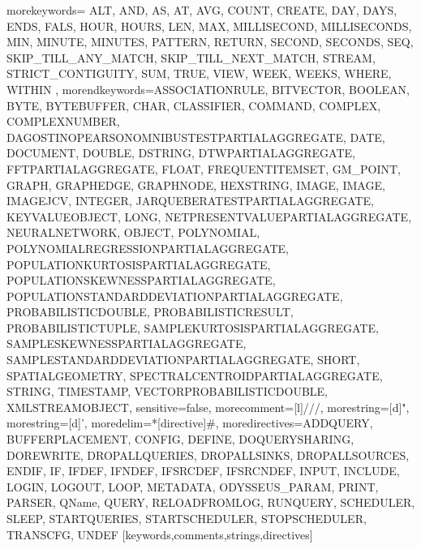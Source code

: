    {morekeywords={%
ALT, AND, AS, AT, AVG, COUNT, CREATE, DAY, DAYS, ENDS, FALS, HOUR, HOURS, LEN, MAX, MILLISECOND, MILLISECONDS, MIN, MINUTE, MINUTES, PATTERN, RETURN, SECOND, SECONDS, SEQ, SKIP_TILL_ANY_MATCH, SKIP_TILL_NEXT_MATCH, STREAM, STRICT_CONTIGUITY, SUM, TRUE, VIEW, WEEK, WEEKS, WHERE, WITHIN%
      },%
   morendkeywords={ASSOCIATIONRULE, BITVECTOR, BOOLEAN, BYTE, BYTEBUFFER, CHAR, CLASSIFIER, COMMAND, COMPLEX, COMPLEXNUMBER, DAGOSTINOPEARSONOMNIBUSTESTPARTIALAGGREGATE, DATE, DOCUMENT, DOUBLE, DSTRING, DTWPARTIALAGGREGATE, FFTPARTIALAGGREGATE, FLOAT, FREQUENTITEMSET, GM_POINT, GRAPH, GRAPHEDGE, GRAPHNODE, HEXSTRING, IMAGE, IMAGE, IMAGEJCV, INTEGER, JARQUEBERATESTPARTIALAGGREGATE, KEYVALUEOBJECT, LONG, NETPRESENTVALUEPARTIALAGGREGATE, NEURALNETWORK, OBJECT, POLYNOMIAL, POLYNOMIALREGRESSIONPARTIALAGGREGATE, POPULATIONKURTOSISPARTIALAGGREGATE, POPULATIONSKEWNESSPARTIALAGGREGATE, POPULATIONSTANDARDDEVIATIONPARTIALAGGREGATE, PROBABILISTICDOUBLE, PROBABILISTICRESULT, PROBABILISTICTUPLE, SAMPLEKURTOSISPARTIALAGGREGATE, SAMPLESKEWNESSPARTIALAGGREGATE, SAMPLESTANDARDDEVIATIONPARTIALAGGREGATE, SHORT, SPATIALGEOMETRY, SPECTRALCENTROIDPARTIALAGGREGATE, STRING, TIMESTAMP, VECTORPROBABILISTICDOUBLE, XMLSTREAMOBJECT},%
   sensitive=false,
   morecomment=[l]///,%
   morestring=[d]",%
   morestring=[d]',%
   moredelim=*[directive]\#,%
   moredirectives={ADDQUERY, BUFFERPLACEMENT, CONFIG, DEFINE, DOQUERYSHARING, DOREWRITE, DROPALLQUERIES, DROPALLSINKS, DROPALLSOURCES, ENDIF, IF, IFDEF, IFNDEF, IFSRCDEF, IFSRCNDEF, INPUT, INCLUDE, LOGIN, LOGOUT, LOOP, METADATA, ODYSSEUS_PARAM, PRINT, PARSER, QName, QUERY, RELOADFROMLOG, RUNQUERY, SCHEDULER, SLEEP, STARTQUERIES, STARTSCHEDULER, STOPSCHEDULER, TRANSCFG, UNDEF}%
}[keywords,comments,strings,directives]

